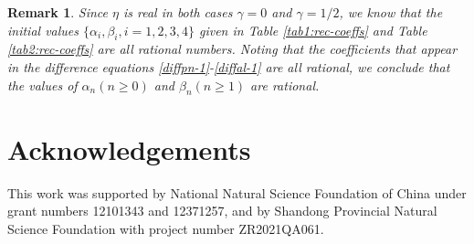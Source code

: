 \documentclass[11pt,a4paper]{article}
\newtheorem{remark}[theorem]{Remark}
\numberwithin{equation}{section}
\begin{document}
\begin{remark}
Since $\eta$ is real in both cases $\gamma=0$ and $\gamma=1/2$,  we know that the initial values $\{\alpha_i,\beta_i,i=1,2,3,4\}$ given in Table \ref{tab1:rec-coeffs} and Table \ref{tab2:rec-coeffs} are all rational numbers. Noting that the coefficients that appear in the difference equations \eqref{diffpn-1}-\eqref{diffal-1} are all rational, we conclude that the values of $\alpha_n (n\geq0)$ and $\beta_n (n\geq1)$ are rational.
\end{remark}


\section*{Acknowledgements}
This work was supported by National Natural Science Foundation of China under grant numbers 12101343 and 12371257, and by Shandong Provincial Natural Science Foundation with project number ZR2021QA061.
\end{document}
